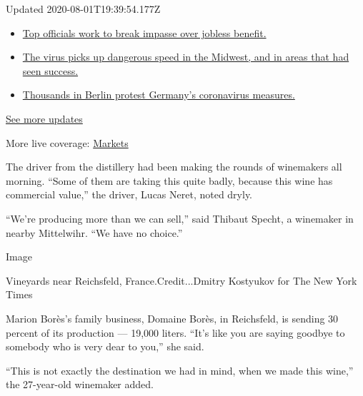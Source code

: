 Updated 2020-08-01T19:39:54.177Z

\begin{itemize}
\tightlist
\item
  \href{https://www.nytimes3xbfgragh.onion/2020/08/01/world/coronavirus-covid-19.html?action=click\&pgtype=Article\&state=default\&region=MAIN_CONTENT_1\&context=storylines_live_updates\#link-3ac56579}{Top
  officials work to break impasse over jobless benefit.}
\item
  \href{https://www.nytimes3xbfgragh.onion/2020/08/01/world/coronavirus-covid-19.html?action=click\&pgtype=Article\&state=default\&region=MAIN_CONTENT_1\&context=storylines_live_updates\#link-8796723}{The
  virus picks up dangerous speed in the Midwest, and in areas that had
  seen success.}
\item
  \href{https://www.nytimes3xbfgragh.onion/2020/08/01/world/coronavirus-covid-19.html?action=click\&pgtype=Article\&state=default\&region=MAIN_CONTENT_1\&context=storylines_live_updates\#link-25930521}{Thousands
  in Berlin protest Germany's coronavirus measures.}
\end{itemize}

\href{https://www.nytimes3xbfgragh.onion/2020/08/01/world/coronavirus-covid-19.html?action=click\&pgtype=Article\&state=default\&region=MAIN_CONTENT_1\&context=storylines_live_updates}{See
more updates}

More live coverage:
\href{https://www.nytimes3xbfgragh.onion/live/2020/07/31/business/stock-market-today-coronavirus?action=click\&pgtype=Article\&state=default\&region=MAIN_CONTENT_1\&context=storylines_live_updates}{Markets}

The driver from the distillery had been making the rounds of winemakers
all morning. ``Some of them are taking this quite badly, because this
wine has commercial value,'' the driver, Lucas Neret, noted dryly.

``We're producing more than we can sell,'' said Thibaut Specht, a
winemaker in nearby Mittelwihr. ``We have no choice.''

Image

Vineyards near Reichsfeld, France.Credit...Dmitry Kostyukov for The New
York Times

Marion Borès's family business, Domaine Borès, in Reichsfeld, is sending
30 percent of its production --- 19,000 liters. ``It's like you are
saying goodbye to somebody who is very dear to you,'' she said.

``This is not exactly the destination we had in mind, when we made this
wine,'' the 27-year-old winemaker added.

